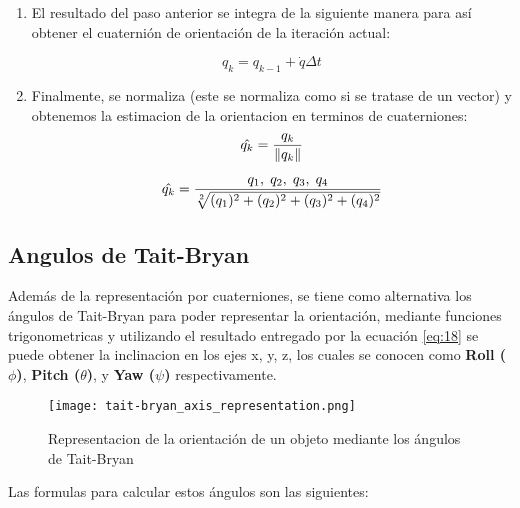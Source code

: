 \begin{enumerate}
        \item El resultado del paso anterior se integra de la siguiente manera para así obtener el cuaternión de orientación de la iteración actual:
        
        \begin{equation}
            q_k = q_{k-1} + \dot{q} \Delta t 
        \end{equation}
    
        \item Finalmente, se normaliza (este se normaliza como si se tratase de un vector) y obtenemos la estimacion de la orientacion en terminos de cuaterniones:
        \begin{equation}
            \hat{q_k} = \frac{q_k}{\lVert q_k\rVert} 
        \end{equation}        
            
        \begin{equation} \label{eq:18}
            \hat{q_k} = \frac{q_1, \hspace{1mm} q_2, \hspace{1mm} q_3, \hspace{1mm} q_4}{\sqrt[2]{(q_1)^2 + (q_2)^2 + (q_3)^2 + (q_4)^2}} 
        \end{equation}
            
    \end{enumerate}

    \subsection{Angulos de Tait-Bryan}

    Además de la representación por cuaterniones, se tiene como alternativa los ángulos de Tait-Bryan para poder representar la orientación, mediante funciones
    trigonometricas y utilizando el resultado entregado por la ecuación \ref{eq:18} se puede obtener la inclinacion en los ejes x, y, z, los cuales se conocen 
    como \textbf{Roll ($ \phi $)}, \textbf{Pitch ($ \theta  $)}, y \textbf{Yaw ($ \psi  $)} respectivamente.

    \begin{figure}[htp!]
        \centering
             \texttt{[image: tait-bryan\_axis\_representation.png]}
              \caption{Representacion de la orientación de un objeto mediante los ángulos de Tait-Bryan}
    \end{figure}
    \FloatBarrier 

    Las formulas para calcular estos ángulos son las siguientes:

